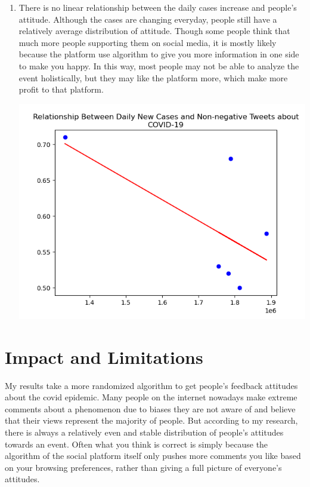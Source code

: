 \documentclass[a4paper, 12pt]{article}
\begin{document}
\begin{enumerate}
\begin{center}
    \end{center}
    \item There is no linear relationship between the daily cases increase and people's attitude. Although the cases are changing everyday, people still have a relatively average distribution of attitude. Though some people think that much more people supporting them on social media, it is mostly likely because the platform use algorithm to give you more information in one side to make you happy. In this way, most people may not be able to analyze the event holistically, but they may like the platform more, which make more profit to that platform. 
    \begin{center}
        \includegraphics[scale=0.7]{relationship.png}
    \end{center}
\end{enumerate}



\section*{Impact and Limitations}
My results take a more randomized algorithm to get people's feedback attitudes about the covid epidemic. Many people on the internet nowadays make extreme comments about a phenomenon due to biases they are not aware of and believe that their views represent the majority of people. But according to my research, there is always a relatively even and stable distribution of people's attitudes towards an event. Often what you think is correct is simply because the algorithm of the social platform itself only pushes more comments you like based on your browsing preferences, rather than giving a full picture of everyone's attitudes.
\end{document}
